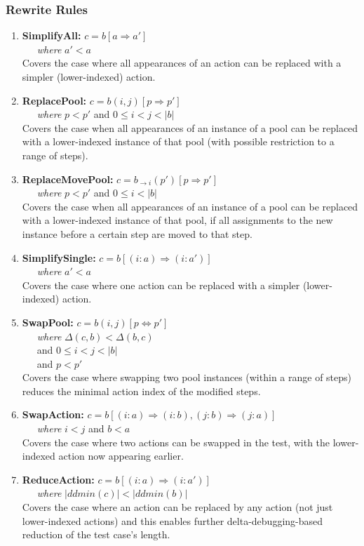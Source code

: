 \subsubsection{Rewrite Rules}

\begin{enumerate}
\item {\bf SimplifyAll:}
$c = b[a \Rightarrow a']$\\
\-\ \ \ \emph{where} $a' < a$\\
Covers the case where all appearances of an action can be replaced with a 
simpler (lower-indexed) action. 
\item {\bf ReplacePool:}
$c = b(i,j)[p \Rightarrow p']$\\ 
\-\ \ \ \emph{where} $p < p'$ and $0 \leq i < j <
|b|$\\
Covers the case when all appearances of an instance of a pool can be replaced with 
a lower-indexed instance of that pool (with possible restriction to a range of steps).
\item {\bf ReplaceMovePool:}
$c = b_{\rightarrow i}(p')[p \Rightarrow p']$\\
\-\ \ \ \emph{where} $p < p'$ and $0
\leq i < |b|$\\
Covers the case when all appearances of an instance of a pool can be replaced with
a lower-indexed instance of that pool, if all assignments to the new instance before a
certain step are moved to that step.
\item {\bf SimplifySingle:}
$c = b[(i: a) \Rightarrow (i: a')]$\\
\-\ \ \ \emph{where} $a' < a$\\
Covers the case where one action can be replaced with a 
simpler (lower-indexed) action. 
\item {\bf SwapPool:}
$c = b(i,j)[p \Leftrightarrow p']$\\
\-\ \ \ \emph{where} $\Delta(c,b) < \Delta(b,c)$\\
\-\ \ \ and $0 \leq i < j < |b|$\\
\-\ \ \ and $p < p'$\\
Covers the case where swapping two pool instances (within a range of steps) reduces
the minimal action index of the modified steps.
\item {\bf SwapAction:}
$c = b[(i: a) \Rightarrow (i: b), (j: b) \Rightarrow (j: a)]$\\
\-\ \ \ \emph{where} $i < j$ and
$b < a$\\
Covers the case where two actions can be swapped in the test, with the
lower-indexed action now appearing earlier.
\item {\bf ReduceAction:}
$c = b[(i: a) \Rightarrow (i: a')]$\\
\-\ \ \ \emph{where} $|ddmin(c)| < |ddmin(b)|$\\
Covers the case where an action can be replaced by any action (not just lower-indexed
actions) and this enables further delta-debugging-based reduction of
the test case's length.
\end{enumerate}

